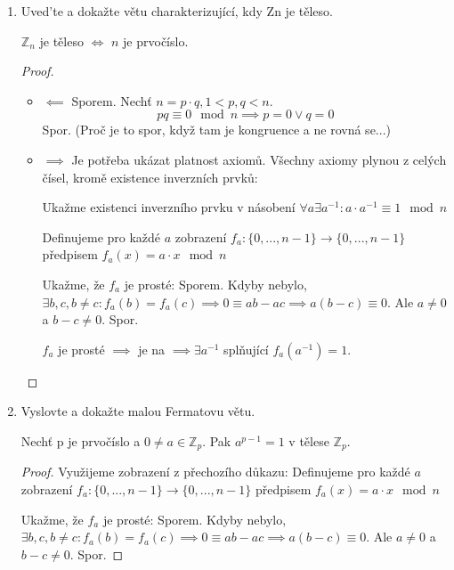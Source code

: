 \documentclass[10pt,a4paper]{article}
\begin{document}
\begin{enumerate}
\begin{proof}
V rámci diagramu: křížení s ostatními hranami neovlivní celkový počet.

Odečtením dvojnásobku, tj. sudého čísla, zachováme paritu.

\end{proof}

\item Uved’te a dokažte větu charakterizující, kdy Zn je těleso.

$\mathbb{Z}_n$ je těleso $\iff$ $n$ je prvočíslo.

\begin{proof}
\begin{itemize}
\item $\impliedby$
Sporem. Nechť $n = p\cdot q, 1 < p,q < n$. 
\begin{equation*}
pq \equiv 0 \mod n \implies p = 0 \vee q = 0
\end{equation*}
Spor. (Proč je to spor, když tam je kongruence a ne rovná se...)

\item $\implies$
Je potřeba ukázat platnost axiomů. Všechny axiomy plynou z celých čísel, kromě existence inverzních prvků:

Ukažme existenci inverzního prvku v násobení $\forall a \exists a^{-1}: a\cdot a^{-1} \equiv 1 \mod n$

Definujeme pro každé $a$ zobrazení $f_a: \{0, ..., n-1 \} \to \{0, ..., n-1 \}$ předpisem $f_a(x) = a \cdot x \mod n$

Ukažme, že $f_a$ je prosté: Sporem. Kdyby nebylo, $\exists b,c, b \neq c: f_a(b) = f_a(c) \implies 0 \equiv ab-ac \implies a (b-c) \equiv 0$. Ale $a \neq 0$ a $b-c \neq 0$. Spor.

$f_a$ je prosté $\implies$ je na $\implies \exists a^{-1}$ splňující $f_a(a^{-1}) = 1$.

\end{itemize}
\end{proof}
\item Vyslovte a dokažte malou Fermatovu větu.

Nechť p je prvočíslo a $0 \neq a \in \mathbb{Z}_p$. Pak $a^{p-1} = 1$ v tělese $\mathbb{Z}_p$.


\begin{proof}
Využijeme zobrazení z přechozího důkazu: 
Definujeme pro každé $a$ zobrazení $f_a: \{0, ..., n-1 \} \to \{0, ..., n-1 \}$ předpisem $f_a(x) = a \cdot x \mod n$

Ukažme, že $f_a$ je prosté: Sporem. Kdyby nebylo, $\exists b,c, b \neq c: f_a(b) = f_a(c) \implies 0 \equiv ab-ac \implies a (b-c) \equiv 0$. Ale $a \neq 0$ a $b-c \neq 0$. Spor.


\end{proof}
\end{enumerate}
\end{document}
